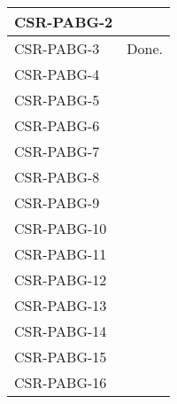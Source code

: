 \begin{longtable}{|p{1.5cm}|p{12cm}|@{}}
CSR-PABG-2&
\begin{minipage}{12cm}
\TODO{}
\end{minipage}\\
\hline
CSR-PABG-3&
\begin{minipage}{12cm}
Done.
\end{minipage}\\
\hline
CSR-PABG-4&
\begin{minipage}{12cm}
\TODO{}
\end{minipage}\\
\hline
CSR-PABG-5&
\begin{minipage}{12cm}
\TODO{}
\end{minipage}\\
\hline
CSR-PABG-6&
\begin{minipage}{12cm}
\end{minipage}\\
\hline
CSR-PABG-7&
\begin{minipage}{12cm}
\end{minipage}\\
\hline
CSR-PABG-8&
\begin{minipage}{12cm}
\end{minipage}\\
\hline
CSR-PABG-9&
\begin{minipage}{12cm}
\end{minipage}\\
\hline
CSR-PABG-10&
\begin{minipage}{12cm}
\end{minipage}\\
\hline
CSR-PABG-11&
\begin{minipage}{12cm}
\end{minipage}\\
\hline
CSR-PABG-12&
\begin{minipage}{12cm}
\end{minipage}\\
\hline
CSR-PABG-13&
\begin{minipage}{12cm}
\end{minipage}\\
\hline
CSR-PABG-14&
\begin{minipage}{12cm}
\end{minipage}\\
\hline
CSR-PABG-15&
\begin{minipage}{12cm}
\end{minipage}\\
\hline
CSR-PABG-16&
\begin{minipage}{12cm}

\end{minipage}
\end{longtable}

